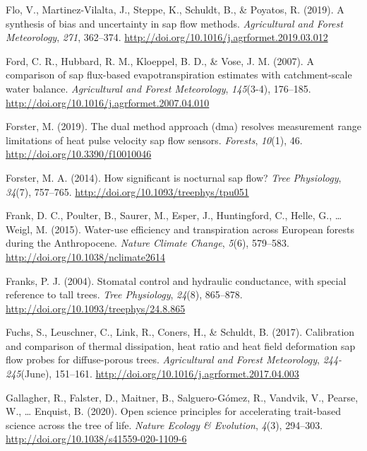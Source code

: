 \documentclass[11pt,twoside]{reedthesis}
\begin{document}
\hypertarget{ref-Flo2019}{}
Flo, V., Martinez-Vilalta, J., Steppe, K., Schuldt, B., \& Poyatos, R.
(2019). A synthesis of bias and uncertainty in sap flow methods.
\emph{Agricultural and Forest Meteorology}, \emph{271}, 362--374.
\url{http://doi.org/10.1016/j.agrformet.2019.03.012}

\hypertarget{ref-Ford2007}{}
Ford, C. R., Hubbard, R. M., Kloeppel, B. D., \& Vose, J. M. (2007). A
comparison of sap flux-based evapotranspiration estimates with
catchment-scale water balance. \emph{Agricultural and Forest
Meteorology}, \emph{145}(3-4), 176--185.
\url{http://doi.org/10.1016/j.agrformet.2007.04.010}

\hypertarget{ref-Forster_2019}{}
Forster, M. (2019). The dual method approach (dma) resolves measurement
range limitations of heat pulse velocity sap flow sensors.
\emph{Forests}, \emph{10}(1), 46. \url{http://doi.org/10.3390/f10010046}

\hypertarget{ref-Forster2014}{}
Forster, M. A. (2014). How significant is nocturnal sap flow? \emph{Tree
Physiology}, \emph{34}(7), 757--765.
\url{http://doi.org/10.1093/treephys/tpu051}

\hypertarget{ref-Frank2015}{}
Frank, D. C., Poulter, B., Saurer, M., Esper, J., Huntingford, C.,
Helle, G., \ldots{} Weigl, M. (2015). Water-use efficiency and
transpiration across European forests during the Anthropocene.
\emph{Nature Climate Change}, \emph{5}(6), 579--583.
\url{http://doi.org/10.1038/nclimate2614}

\hypertarget{ref-Franks2004}{}
Franks, P. J. (2004). Stomatal control and hydraulic conductance, with
special reference to tall trees. \emph{Tree Physiology}, \emph{24}(8),
865--878. \url{http://doi.org/10.1093/treephys/24.8.865}

\hypertarget{ref-Fuchs2017}{}
Fuchs, S., Leuschner, C., Link, R., Coners, H., \& Schuldt, B. (2017).
Calibration and comparison of thermal dissipation, heat ratio and heat
field deformation sap flow probes for diffuse-porous trees.
\emph{Agricultural and Forest Meteorology}, \emph{244-245}(June),
151--161. \url{http://doi.org/10.1016/j.agrformet.2017.04.003}

\hypertarget{ref-Gallagher2020}{}
Gallagher, R., Falster, D., Maitner, B., Salguero-Gómez, R., Vandvik,
V., Pearse, W., \ldots{} Enquist, B. (2020). Open science principles for
accelerating trait-based science across the tree of life. \emph{Nature
Ecology \& Evolution}, \emph{4}(3), 294--303.
\url{http://doi.org/10.1038/s41559-020-1109-6}
\end{document}
